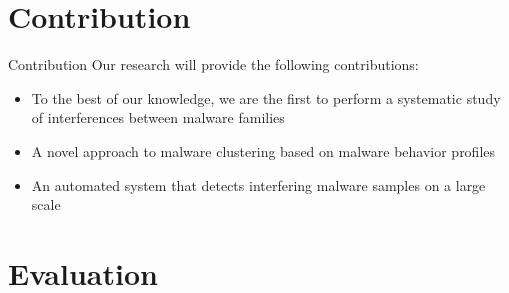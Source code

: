 \documentclass[]{beamer}
\begin{document}
\section{Contribution}
\begin{frame}[t]{Contribution}
Our research will provide the following contributions:
\begin{itemize}
  \item To the best of our knowledge, we are the first to perform a systematic study of interferences between malware families\\
  \item A novel approach to malware clustering based on malware behavior profiles
  \item An automated system that detects interfering malware samples on a large scale
\end{itemize}
\end{frame}

\section{Evaluation}
\label{sec:Evaluation}
\end{document}
